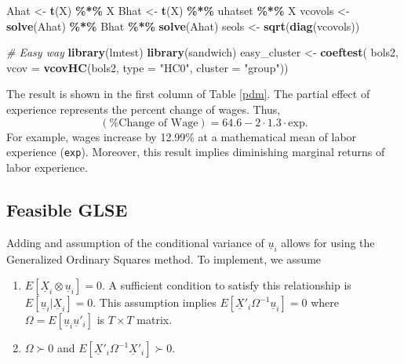 \documentclass[
  12pt,
]{article}
\newenvironment{Shaded}{\begin{snugshade}}{\end{snugshade}}
\newcommand{\CommentTok}[1]{\textcolor[rgb]{0.56,0.35,0.01}{\textit{#1}}}
\newcommand{\DataTypeTok}[1]{\textcolor[rgb]{0.13,0.29,0.53}{#1}}
\newcommand{\KeywordTok}[1]{\textcolor[rgb]{0.13,0.29,0.53}{\textbf{#1}}}
\newcommand{\NormalTok}[1]{#1}
\newcommand{\OperatorTok}[1]{\textcolor[rgb]{0.81,0.36,0.00}{\textbf{#1}}}
\newcommand{\StringTok}[1]{\textcolor[rgb]{0.31,0.60,0.02}{#1}}
\providecommand{\tightlist}{%
  \setlength{\itemsep}{0pt}\setlength{\parskip}{0pt}}
\begin{document}
\begin{Shaded}
\begin{Highlighting}[]
\NormalTok{Ahat \textless{}{-}}\StringTok{ }\KeywordTok{t}\NormalTok{(X) }\OperatorTok{\%*\%}\StringTok{ }\NormalTok{X}
\NormalTok{Bhat \textless{}{-}}\StringTok{ }\KeywordTok{t}\NormalTok{(X) }\OperatorTok{\%*\%}\StringTok{ }\NormalTok{uhatset }\OperatorTok{\%*\%}\StringTok{ }\NormalTok{X}
\NormalTok{vcovols \textless{}{-}}\StringTok{ }\KeywordTok{solve}\NormalTok{(Ahat) }\OperatorTok{\%*\%}\StringTok{ }\NormalTok{Bhat }\OperatorTok{\%*\%}\StringTok{ }\KeywordTok{solve}\NormalTok{(Ahat)}
\NormalTok{seols \textless{}{-}}\StringTok{ }\KeywordTok{sqrt}\NormalTok{(}\KeywordTok{diag}\NormalTok{(vcovols))}

\CommentTok{\# Easy way}
\KeywordTok{library}\NormalTok{(lmtest)}
\KeywordTok{library}\NormalTok{(sandwich)}
\NormalTok{easy\_cluster \textless{}{-}}\StringTok{ }\KeywordTok{coeftest}\NormalTok{(}
\NormalTok{  bols2, }\DataTypeTok{vcov =} \KeywordTok{vcovHC}\NormalTok{(bols2, }\DataTypeTok{type =} \StringTok{"HC0"}\NormalTok{, }\DataTypeTok{cluster =} \StringTok{"group"}\NormalTok{))}
\end{Highlighting}
\end{Shaded}

The result is shown in the first column of Table \ref{pdm}.
The partial effect of experience represents the percent change of wages.
Thus,
\[
  (\text{\% Change of Wage}) = 64.6 - 2 \cdot 1.3 \cdot \text{exp}.
\]
For example, wages increase by 12.99\% at a mathematical mean of labor experience (\texttt{exp}).
Moreover, this result implies diminishing marginal returns of labor experience.

\hypertarget{feasible-glse}{%
\subsection{Feasible GLSE}\label{feasible-glse}}

Adding and assumption of the conditional variance of \(\underline{u}_i\)
allows for using the Generalized Ordinary Squares method.
To implement, we assume

\begin{enumerate}
\def\labelenumi{\arabic{enumi}.}
\tightlist
\item
  \(E[\underline{X}_i \otimes \underline{u}_i] = 0\). A sufficient condition to satisfy this relationship is \(E[ \underline{u}_i | \underline{X}_i] = 0\). This assumption implies \(E[\underline{X}'_i \Omega^{-1} \underline{u}_i] = 0\) where \(\Omega = E[\underline{u}_i\underline{u}'_i]\) is \(T \times T\) matrix.
\item
  \(\Omega \succ 0\) and \(E[\underline{X}'_i \Omega^{-1} \underline{X}'_i] \succ 0\).
\end{enumerate}
\end{document}
